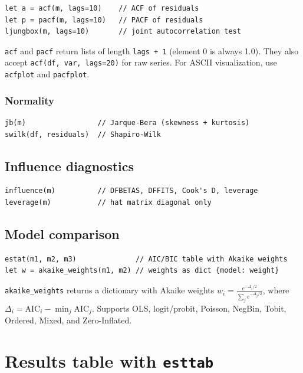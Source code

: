 \begin{lstlisting}
let a = acf(m, lags=10)    // ACF of residuals
let p = pacf(m, lags=10)   // PACF of residuals
ljungbox(m, lags=10)       // joint autocorrelation test
\end{lstlisting}

\texttt{acf} and \texttt{pacf} return lists of length \texttt{lags + 1}
(element 0 is always 1.0). They also accept \texttt{acf(df, var, lags=20)}
for raw series. For ASCII visualization, use \texttt{acfplot} and
\texttt{pacfplot}.

\subsubsection*{Normality}

\begin{lstlisting}
jb(m)                 // Jarque-Bera (skewness + kurtosis)
swilk(df, residuals)  // Shapiro-Wilk
\end{lstlisting}

\subsection{Influence diagnostics}

\begin{lstlisting}
influence(m)          // DFBETAS, DFFITS, Cook's D, leverage
leverage(m)           // hat matrix diagonal only
\end{lstlisting}

\subsection{Model comparison}

\begin{lstlisting}
estat(m1, m2, m3)              // AIC/BIC table with Akaike weights
let w = akaike_weights(m1, m2) // weights as dict {model: weight}
\end{lstlisting}

\texttt{akaike\_weights} returns a dictionary with Akaike weights
$w_i = \frac{e^{-\Delta_i/2}}{\sum_j e^{-\Delta_j/2}}$, where $\Delta_i =
\mathrm{AIC}_i - \min_j \mathrm{AIC}_j$. Supports OLS, logit/probit, Poisson,
NegBin, Tobit, Ordered, Mixed, and Zero-Inflated.

\section{Results table with \texttt{esttab}}

